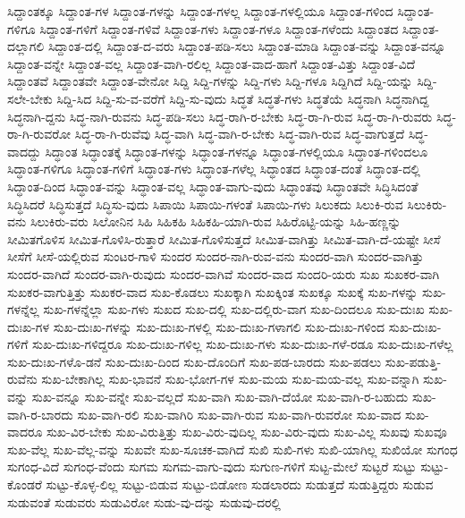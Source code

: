 {ಸಿದ್ದಾಂತಕ್ಕೂ
ಸಿದ್ದಾಂತ-ಗಳ
ಸಿದ್ದಾಂತ-ಗಳನ್ನು
ಸಿದ್ದಾಂತ-ಗಳಲ್ಲ
ಸಿದ್ದಾಂತ-ಗಳಲ್ಲಿಯೂ
ಸಿದ್ದಾಂತ-ಗಳಿಂದ
ಸಿದ್ದಾಂತ-ಗಳಿಗೂ
ಸಿದ್ದಾಂತ-ಗಳಿಗೆ
ಸಿದ್ದಾಂತ-ಗಳಿವೆ
ಸಿದ್ದಾಂತ-ಗಳು
ಸಿದ್ದಾಂತ-ಗಳೂ
ಸಿದ್ದಾಂತ-ಗಳೆಂದು
ಸಿದ್ದಾಂತದ
ಸಿದ್ದಾಂತ-ದಲ್ಲಾಗಲಿ
ಸಿದ್ದಾಂತ-ದಲ್ಲಿ
ಸಿದ್ದಾಂತ-ದ-ವರು
ಸಿದ್ದಾಂತ-ಪಡಿ-ಸಲು
ಸಿದ್ದಾಂತ-ಮಾಡಿ
ಸಿದ್ದಾಂತ-ವನ್ನು
ಸಿದ್ದಾಂತ-ವನ್ನೂ
ಸಿದ್ದಾಂತ-ವನ್ನೇ
ಸಿದ್ದಾಂತ-ವಲ್ಲ
ಸಿದ್ದಾಂತ-ವಾಗಿ-ರಲಿಲ್ಲ
ಸಿದ್ದಾಂತ-ವಾದ-ಹಾಗೆ
ಸಿದ್ದಾಂತ-ವಿತ್ತು
ಸಿದ್ದಾಂತ-ವಿದೆ
ಸಿದ್ದಾಂತವೆ
ಸಿದ್ದಾಂತವೇ
ಸಿದ್ದಾಂತ-ವೇನೋ
ಸಿದ್ದಿ
ಸಿದ್ದಿ-ಗಳನ್ನು
ಸಿದ್ದಿ-ಗಳು
ಸಿದ್ದಿ-ಗಳೂ
ಸಿದ್ದಿಗಿದೆ
ಸಿದ್ದಿ-ಯನ್ನು
ಸಿದ್ದಿ-ಸಲೇ-ಬೇಕು
ಸಿದ್ದಿ-ಸಿದ
ಸಿದ್ದಿ-ಸು-ವ-ವರೆಗೆ
ಸಿದ್ದಿ-ಸು-ವುದು
ಸಿದ್ಧತೆ
ಸಿದ್ಧತೆ-ಗಳು
ಸಿದ್ಧತೆಯೆ
ಸಿದ್ಧನಾಗಿ
ಸಿದ್ಧನಾಗಿದ್ದ
ಸಿದ್ಧನಾಗಿ-ದ್ದನು
ಸಿದ್ಧ-ನಾಗಿ-ರುವನು
ಸಿದ್ಧ-ಪಡಿ-ಸಲು
ಸಿದ್ಧ-ರಾಗಿ-ರ-ಬೇಕು
ಸಿದ್ಧ-ರಾ-ಗಿ-ರುವ
ಸಿದ್ಧ-ರಾ-ಗಿ-ರುವರು
ಸಿದ್ಧ-ರಾ-ಗಿ-ರುವರೋ
ಸಿದ್ಧ-ರಾ-ಗಿ-ರುವೆವು
ಸಿದ್ಧ-ವಾಗಿ
ಸಿದ್ಧ-ವಾಗಿ-ರ-ಬೇಕು
ಸಿದ್ಧ-ವಾಗಿ-ರುವ
ಸಿದ್ಧ-ವಾಗುತ್ತದೆ
ಸಿದ್ಧ-ವಾದದ್ದು
ಸಿದ್ಧಾಂತ
ಸಿದ್ಧಾಂತಕ್ಕೆ
ಸಿದ್ಧಾಂತ-ಗಳನ್ನು
ಸಿದ್ಧಾಂತ-ಗಳನ್ನೂ
ಸಿದ್ಧಾಂತ-ಗಳಲ್ಲಿಯೂ
ಸಿದ್ಧಾಂತ-ಗಳಿಂದಲೂ
ಸಿದ್ಧಾಂತ-ಗಳಿಗೂ
ಸಿದ್ಧಾಂತ-ಗಳಿಗೆ
ಸಿದ್ಧಾಂತ-ಗಳು
ಸಿದ್ಧಾಂತ-ಗಳೆಲ್ಲ
ಸಿದ್ಧಾಂತದ
ಸಿದ್ಧಾಂತ-ದಂತೆ
ಸಿದ್ಧಾಂತ-ದಲ್ಲಿ
ಸಿದ್ಧಾಂತ-ದಿಂದ
ಸಿದ್ಧಾಂತ-ವನ್ನು
ಸಿದ್ಧಾಂತ-ವಲ್ಲ
ಸಿದ್ಧಾಂತ-ವಾಗು-ವುದು
ಸಿದ್ಧಾಂತವು
ಸಿದ್ಧಾಂತವೇ
ಸಿದ್ಧಿಸಿದಂತೆ
ಸಿದ್ಧಿಸಿದರೆ
ಸಿದ್ಧಿಸುತ್ತದೆ
ಸಿದ್ಧಿಸು-ವುದು
ಸಿಪಾಯಿ
ಸಿಪಾಯಿ-ಗಳಂತೆ
ಸಿಪಾಯಿ-ಗಳು
ಸಿಲುಕದು
ಸಿಲುಕಿ-ರುವ
ಸಿಲುಕಿರು-ವನು
ಸಿಲುಕಿರು-ವರು
ಸಿಲೋನಿನ
ಸಿಹಿ
ಸಿಹಿಕಹಿ
ಸಿಹಿಕಹಿ-ಯಾಗಿ-ರುವ
ಸಿಹಿರೊಟ್ಟಿ-ಯನ್ನು
ಸಿಹಿ-ಹಣ್ಣನ್ನು
ಸೀಮಿತಗೊಳಿಸ
ಸೀಮಿತ-ಗೊಳಿಸಿ-ರುತ್ತಾರೆ
ಸೀಮಿತ-ಗೊಳಿಸುತ್ತದೆ
ಸೀಮಿತ-ವಾಗಿತ್ತು
ಸೀಮಿತ-ವಾಗಿ-ದೆ-ಯಷ್ಟೇ
ಸೀಸೆ
ಸೀಸೆಗೆ
ಸೀಸೆ-ಯಲ್ಲಿರುವ
ಸುಂಟರ-ಗಾಳಿ
ಸುಂದರ
ಸುಂದರ-ನಾಗಿ-ರುವ-ವನು
ಸುಂದರ-ವಾಗಿ
ಸುಂದರ-ವಾಗಿತ್ತು
ಸುಂದರ-ವಾಗಿದೆ
ಸುಂದರ-ವಾಗಿ-ರುವುದು
ಸುಂದರ-ವಾಗಿವೆ
ಸುಂದರ-ವಾದ
ಸುಂದರಿ-ಯರು
ಸುಖ
ಸುಖಕರ-ವಾಗಿ
ಸುಖಕರ-ವಾಗುತ್ತಿತ್ತು
ಸುಖಕರ-ವಾದ
ಸುಖ-ಕೊಡಲು
ಸುಖಕ್ಕಾಗಿ
ಸುಖಕ್ಕಿಂತ
ಸುಖಕ್ಕೂ
ಸುಖಕ್ಕೆ
ಸುಖ-ಗಳನ್ನು
ಸುಖ-ಗಳನ್ನೆಲ್ಲ
ಸುಖ-ಗಳನ್ನೆಲ್ಲಾ
ಸುಖ-ಗಳು
ಸುಖದ
ಸುಖ-ದಲ್ಲಿ
ಸುಖ-ದಲ್ಲಿರು-ವಾಗ
ಸುಖ-ದಿಂದಲೂ
ಸುಖ-ದುಃಖ
ಸುಖ-ದುಃಖ-ಗಳ
ಸುಖ-ದುಃಖ-ಗಳನ್ನು
ಸುಖ-ದುಃಖ-ಗಳಲ್ಲಿ
ಸುಖ-ದುಃಖ-ಗಳಾಗಲಿ
ಸುಖ-ದುಃಖ-ಗಳಿಂದ
ಸುಖ-ದುಃಖ-ಗಳಿಗೆ
ಸುಖ-ದುಃಖ-ಗಳಿದ್ದರೂ
ಸುಖ-ದುಃಖ-ಗಳಿಲ್ಲ
ಸುಖ-ದುಃಖ-ಗಳು
ಸುಖ-ದುಃಖ-ಗಳೆ-ರಡೂ
ಸುಖ-ದುಃಖ-ಗಳೆಲ್ಲ
ಸುಖ-ದುಃಖ-ಗಳೊ-ಡನೆ
ಸುಖ-ದುಃಖ-ದಿಂದ
ಸುಖ-ದೊಂದಿಗೆ
ಸುಖ-ಪಡ-ಬಾರದು
ಸುಖ-ಪಡಲು
ಸುಖ-ಪಡುತ್ತಿ-ರುವೆನು
ಸುಖ-ಬೇಕಾಗಿಲ್ಲ
ಸುಖ-ಭಾವನೆ
ಸುಖ-ಭೋಗ-ಗಳ
ಸುಖ-ಮಯ
ಸುಖ-ಮಯ-ವಲ್ಲ
ಸುಖ-ವನ್ನಾಗಿ
ಸುಖ-ವನ್ನು
ಸುಖ-ವನ್ನೂ
ಸುಖ-ವನ್ನೇ
ಸುಖ-ವಲ್ಲದೆ
ಸುಖ-ವಾಗಿ
ಸುಖ-ವಾಗಿ-ದೆಯೋ
ಸುಖ-ವಾಗಿ-ರ-ಬಹುದು
ಸುಖ-ವಾಗಿ-ರ-ಬಾರದು
ಸುಖ-ವಾಗಿ-ರಲಿ
ಸುಖ-ವಾಗಿರಿ
ಸುಖ-ವಾಗಿ-ರುವ
ಸುಖ-ವಾಗಿ-ರುವರೋ
ಸುಖ-ವಾದ
ಸುಖ-ವಾದರೂ
ಸುಖ-ವಿರ-ಬೇಕು
ಸುಖ-ವಿರುತ್ತಿತ್ತು
ಸುಖ-ವಿರು-ವುದಿಲ್ಲ
ಸುಖ-ವಿರು-ವುದು
ಸುಖ-ವಿಲ್ಲ
ಸುಖವು
ಸುಖವೂ
ಸುಖ-ವೆಲ್ಲ
ಸುಖ-ವೆಲ್ಲ-ವನ್ನು
ಸುಖವೇ
ಸುಖ-ಸೂಚಕ-ವಾಗಿದೆ
ಸುಖಿ
ಸುಖಿ-ಗಳು
ಸುಖಿ-ಯಾಗಿಲ್ಲ
ಸುಖಿಯೋ
ಸುಗಂಧ
ಸುಗಂಧ-ವಿದೆ
ಸುಗಂಧ-ವೆಂದು
ಸುಗಮ
ಸುಗಮ-ವಾಗು-ವುದು
ಸುಗುಣ-ಗಳಿಗೆ
ಸುಟ್ಟ-ಮೇಲೆ
ಸುಟ್ಟರೆ
ಸುಟ್ಟು
ಸುಟ್ಟು-ಕೊಂಡರೆ
ಸುಟ್ಟು-ಕೊಳ್ಳ-ಲಿಲ್ಲ
ಸುಟ್ಟು-ಬಿಡುವ
ಸುಟ್ಟು-ಬಿಡೋಣ
ಸುಡಲಾರದು
ಸುಡುತ್ತದೆ
ಸುಡುತ್ತಿದ್ದರು
ಸುಡುವ
ಸುಡುವಂತೆ
ಸುಡುವರು
ಸುಡುವಿರೋ
ಸುಡು-ವು-ದನ್ನು
ಸುಡುವು-ದರಲ್ಲಿ
}
